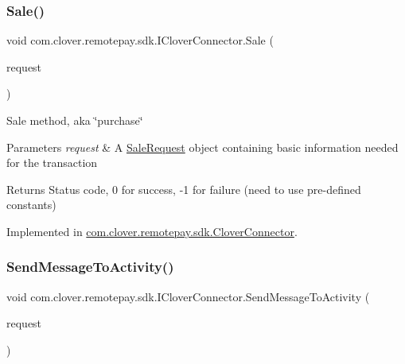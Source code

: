 \subsubsection{\texorpdfstring{Sale()}{Sale()}}
{\footnotesize\ttfamily void com.\+clover.\+remotepay.\+sdk.\+I\+Clover\+Connector.\+Sale (\begin{DoxyParamCaption}\item[{\hyperlink{classcom_1_1clover_1_1remotepay_1_1sdk_1_1_sale_request}{Sale\+Request}}]{request }\end{DoxyParamCaption})}



Sale method, aka \char`\"{}purchase\char`\"{} 


\begin{DoxyParams}{Parameters}
{\em request} & A \hyperlink{classcom_1_1clover_1_1remotepay_1_1sdk_1_1_sale_request}{Sale\+Request} object containing basic information needed for the transaction\\
\hline
\end{DoxyParams}
\begin{DoxyReturn}{Returns}
Status code, 0 for success, -\/1 for failure (need to use pre-\/defined constants)
\end{DoxyReturn}


Implemented in \hyperlink{classcom_1_1clover_1_1remotepay_1_1sdk_1_1_clover_connector_a1adbcc8a0d4aaa82157a102af4f16b91}{com.\+clover.\+remotepay.\+sdk.\+Clover\+Connector}.

\mbox{\label{interfacecom_1_1clover_1_1remotepay_1_1sdk_1_1_i_clover_connector_ad6e241f6dac22bafa5edcc89457c99a7}} 
\subsubsection{\texorpdfstring{Send\+Message\+To\+Activity()}{SendMessageToActivity()}}
{\footnotesize\ttfamily void com.\+clover.\+remotepay.\+sdk.\+I\+Clover\+Connector.\+Send\+Message\+To\+Activity (\begin{DoxyParamCaption}\item[{\hyperlink{classcom_1_1clover_1_1remotepay_1_1sdk_1_1_message_to_activity}{Message\+To\+Activity}}]{request }\end{DoxyParamCaption})}



